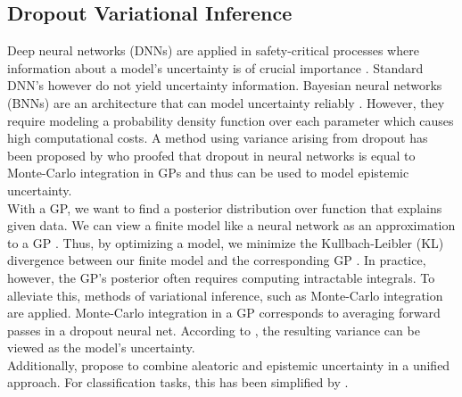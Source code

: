 \documentclass[a4paper,cleardoubleempty,BCOR1cm, 11pt]{report}
\begin{document}
\subsection{Dropout Variational Inference} %
Deep neural networks (DNNs) are applied in safety-critical processes where information about a model's uncertainty is of crucial importance \cite{najafabadi2015deep,krzywinski2013importance}. Standard DNN's however do not yield uncertainty information. Bayesian neural networks (BNNs) are an architecture that can model uncertainty reliably \cite{mullachery2018bayesian}. However, they require modeling a probability density function over each parameter which causes high computational costs. A method using variance arising from dropout has been proposed by \citet{gal2016dropout} who proofed that dropout in neural networks is equal to Monte-Carlo integration in GPs and thus can be used to model epistemic uncertainty.\\
With a GP, we want to find a posterior distribution over function that explains given data. We can view a finite model like a neural network as an approximation to a GP \cite{damianou2013deep}. Thus, by optimizing a model, we minimize the Kullbach-Leibler (KL) divergence between our finite model and the corresponding GP \cite{gal2016dropout}. In practice, however, the GP's posterior often requires computing intractable integrals. To alleviate this, methods of variational inference, such as Monte-Carlo integration are applied. Monte-Carlo integration in a GP corresponds to averaging forward passes in a dropout neural net. According to \citet{gal2016dropout}, the resulting variance can be viewed as the model's uncertainty.
\\
Additionally, \citet{kendall2017uncertainties} propose to combine aleatoric and epistemic uncertainty in a unified approach. For classification tasks, this has been simplified by \citet{kwon2020uncertainty}.
\end{document}
